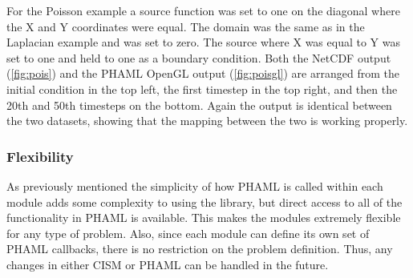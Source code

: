 
  

For the Poisson example a source function was set to one on the diagonal where the X and Y coordinates were equal.  The domain was the same as in the Laplacian example and was set to zero.  The source where X was equal to Y was set to one and held to one as a boundary condition.  Both the NetCDF output (\ref{fig:pois}) and the PHAML OpenGL output (\ref{fig:poisgl}) are arranged from the initial condition in the top left, the first timestep in the top right, and then the 20th and 50th timesteps on the bottom.  Again the output is identical between the two datasets, showing that the mapping between the two is working properly.


  

\subsubsection{Flexibility}

As previously mentioned the simplicity of how PHAML is called within each module adds some complexity to using the library, but direct access to all of the functionality in PHAML is available.  This makes the modules extremely flexible for any type of problem.  Also, since each module can define its own set of PHAML callbacks, there is no restriction on the problem definition.  Thus, any changes in either CISM or PHAML can be handled in the future.
